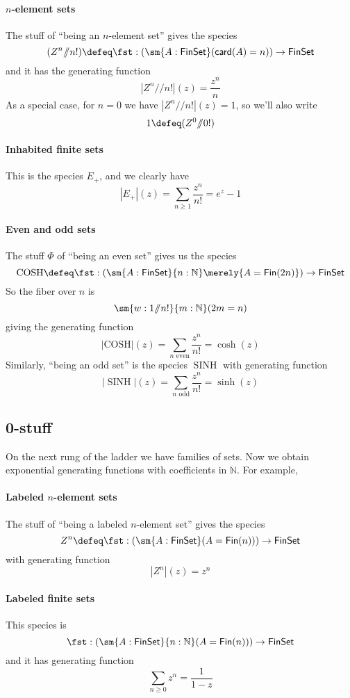 \documentclass[fleqn]{article}
\newcommand{\card}{\mathsf{card}}
\newcommand{\gf}[1]{\abs{#1}\!(z)}
\newcommand{\fin}{\mathsf{Fin}}
\newcommand{\finset}{\mathsf{FinSet}}
\newcommand{\abs}[1]{\left\lvert #1 \right\rvert}
\newcommand{\sslash}{/\!\!/}
\DeclareMathOperator{\SINH}{SINH}
\theoremstyle{theorem}
\theoremstyle{definition}
\begin{document}
\paragraph{$n$-element sets}
The stuff of ``being an $n$-element set'' gives the species
\[
  (Z^{n} \sslash n!) \defeq 
  \fst : \left(
    \sm{A : \finset}(\card(A) = n)
  \right) \to \finset
\]
and it has the generating function
\[
  \gf{Z^{n} \sslash n!} = \frac{z^{n}}{n}
\]
As a special case, for $n = 0$ we have $\gf{Z^{n} \sslash n!} = 1$, so we'll
also write
\[
  1 \defeq (Z^{0} \sslash 0!)
\]


\paragraph{Inhabited finite sets}
This is the species $E_{+}$, and we clearly have
\[
  \gf{E_{+}} = \sum_{n\geq1}\frac{z^{n}}{n!} = e^{z} - 1
\]

\paragraph{Even and odd sets}
The stuff $\Phi$ of ``being an even set'' gives us the species
\[
  \mathrm{COSH} \defeq \fst :
  \left(\sm{A : \finset}{n:\mathbb{N}}\merely{A = \fin(2n)}\right)
  \to
  \finset
\]
So the fiber over $n$ is
\[
  \sm{w : 1 \sslash n!}{m:\mathbb{N}}(2m = n)
\]
giving the generating function
\[
  \gf{\mathrm{COSH}} = \sum_{\text{$n$ even}}\frac{z^{n}}{n!} = \cosh(z)
\]
Similarly, ``being an odd set'' is the species $\SINH$ with generating
function
\[
  \gf{\SINH} = \sum_{\text{$n$ odd}} \frac{z^{n}}{n!} = \sinh(z)
\]


\subsection{0-stuff}
On the next rung of the ladder we have families of sets.  Now we obtain
exponential generating functions with coefficients in $\mathbb{N}$.  For
example, 

\paragraph{Labeled $n$-element sets}
The stuff of ``being a labeled $n$-element set'' gives the species
\[
  Z^{n} \defeq \fst : \left(
    \sm{A : \finset} (A = \fin(n))
  \right) \to \finset
\]
with generating function
\[
  \gf{Z^{n}} = z^{n}
\]

\paragraph{Labeled finite sets}
This species is
\[
  \fst : \left(
    \sm{A : \finset}{n:\mathbb{N}}(A = \fin(n))
  \right) \to \finset
\]
and it has generating function
\[
  \sum_{n\geq0} z^{n} = \frac{1}{1 - z}
\]
\end{document}
